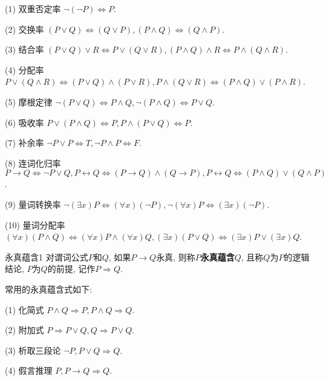(1) 双重否定率      $\neg(\neg P) \Leftrightarrow P$.

(2) 交换率               $(P\vee Q) \Leftrightarrow  (Q\vee P),  ( P\wedge Q) \Leftrightarrow  ( Q\wedge P)$.

(3) 结合率               $(P\vee Q)\vee R \Leftrightarrow  P\vee (Q\vee R),
               (P\wedge Q)\wedge R \Leftrightarrow  P\wedge (Q\wedge R)$.

(4) 分配率               $P\vee (Q\wedge R) \Leftrightarrow  (P\vee Q)\wedge (P\vee R),
               P\wedge (Q\vee R) \Leftrightarrow  (P\wedge Q)\vee (P\wedge R)$.

(5) 摩根定律        $\neg  (P\vee Q) \Leftrightarrow  P\wedge Q,
              \neg  (P\wedge Q) \Leftrightarrow P\vee Q$.

(6) 吸收率              $ P\vee (P\wedge Q) \Leftrightarrow P,
                P\wedge (P\vee Q) \Leftrightarrow P$.

(7) 补余率               $\neg P\vee P \Leftrightarrow  T, \neg  P\wedge P \Leftrightarrow  F$.

(8) 连词化归率      $ P\rightarrow Q \Leftrightarrow  \neg P\vee Q,
               P\longleftrightarrow Q \Leftrightarrow  (P\rightarrow Q)\wedge (Q\rightarrow P),
               P\longleftrightarrow Q \Leftrightarrow  (P\wedge Q)\vee (Q\wedge P)$.

(9) 量词转换率     $ \neg  (\exists x)P \Leftrightarrow  (\forall x)( \neg  P),
              \neg  (\forall x)P \Leftrightarrow  (\exists x) (\neg  P)$.

(10) 量词分配率    $(\forall x) (P\wedge Q) \Leftrightarrow  (\forall x)P\wedge (\forall x)Q, (∃x) (P\vee Q) \Leftrightarrow  (\exists x)P\vee (\exists x)Q$.

\begin{mydef}{永真蕴含}{1}
对谓词公式$P$和$Q$, 如果$P\rightarrow Q$永真, 则称\textbf{$P$永真蕴含$Q$}, 且称$Q$为$P$的逻辑结论, $P$为$Q$的前提, 记作\textcolor[rgb]{0,0,1}{$P \Rightarrow Q$}.
\end{mydef}

常用的永真蕴含式如下:

      (1) 化简式     $P\wedge Q \Rightarrow  P,   P\wedge Q \Rightarrow Q$.

      (2) 附加式     $P \Rightarrow P\vee Q,   Q \Rightarrow  P\vee Q$.

      (3) 析取三段论    $\neg P, P\vee Q \Rightarrow  Q$.

      (4) 假言推理       $ P, P\rightarrow Q \Rightarrow  Q$.


